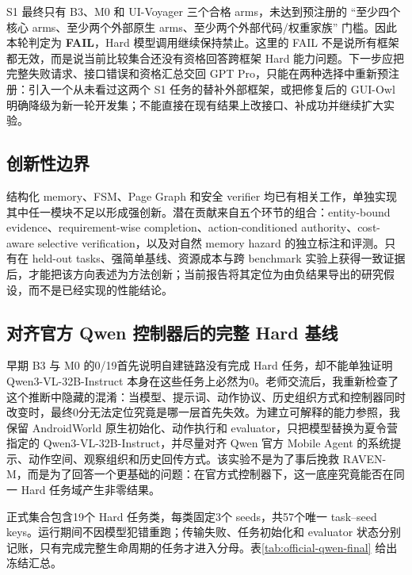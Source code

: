 \documentclass[12pt,a4paper]{ctexart}
\begin{document}
S1 最终只有 B3、M0 和 UI-Voyager 三个合格 arms，未达到预注册的 ``至少四个核心 arms、至少两个外部原生 arms、至少两个外部代码/权重家族'' 门槛。因此本轮判定为 \textbf{FAIL}，Hard 模型调用继续保持禁止。这里的 FAIL 不是说所有框架都无效，而是说当前比较集合还没有资格回答跨框架 Hard 能力问题。下一步应把完整失败请求、接口错误和资格汇总交回 GPT Pro，只能在两种选择中重新预注册：引入一个从未看过这两个 S1 任务的替补外部框架，或把修复后的 GUI-Owl 明确降级为新一轮开发集；不能直接在现有结果上改接口、补成功并继续扩大实验。

\subsection{创新性边界}

结构化 memory、FSM、Page Graph 和安全 verifier 均已有相关工作，单独实现其中任一模块不足以形成强创新。潜在贡献来自五个环节的组合：entity-bound evidence、requirement-wise completion、action-conditioned authority、cost-aware selective verification，以及对自然 memory hazard 的独立标注和评测。只有在 held-out tasks、强简单基线、资源成本与跨 benchmark 实验上获得一致证据后，才能把该方向表述为方法创新；当前报告将其定位为由负结果导出的研究假设，而不是已经实现的性能结论。

\fi



\subsection{对齐官方 Qwen 控制器后的完整 Hard 基线}

早期 B3 与 M0 的0/19首先说明自建链路没有完成 Hard 任务，却不能单独证明 Qwen3-VL-32B-Instruct 本身在这些任务上必然为0。老师交流后，我重新检查了这个推断中隐藏的混淆：当模型、提示词、动作协议、历史组织方式和控制器同时改变时，最终0分无法定位究竟是哪一层首先失效。为建立可解释的能力参照，我保留 AndroidWorld 原生初始化、动作执行和 evaluator，只把模型替换为夏令营指定的 Qwen3-VL-32B-Instruct，并尽量对齐 Qwen 官方 Mobile Agent 的系统提示、动作空间、观察组织和历史回传方式。该实验不是为了事后挽救 RAVEN-M，而是为了回答一个更基础的问题：在官方式控制器下，这一底座究竟能否在同一 Hard 任务域产生非零结果。

正式集合包含19个 Hard 任务类，每类固定3个 seeds，共57个唯一 task--seed keys。运行期间不因模型犯错重跑；传输失败、任务初始化和 evaluator 状态分别记账，只有完成完整生命周期的任务才进入分母。表\ref{tab:official-qwen-final} 给出冻结汇总。
\end{document}
